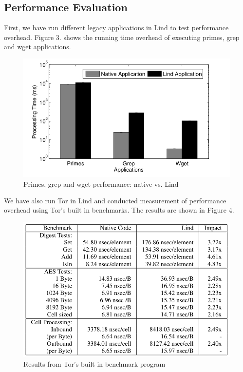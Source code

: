 \subsection{Performance Evaluation}

First, we have run different legacy applications in Lind to test performance overhead. Figure 3. shows the running time 
overhead of executing primes, grep and wget applications. 


\begin{figure}[h]
\centering
\includegraphics[width=1.0\columnwidth]{diagram/evaluation_01.png}
\caption{Primes, grep and wget performance: native vs. Lind}
\label{fig:arch}
\end{figure}


We have also run Tor in Lind and conducted measurement of performance overhead using Tor's built in benchmarks. 
The results are shown in Figure 4.


\begin{figure}[h]
\centering
\includegraphics[width=0.9\columnwidth]{diagram/evaluation_02.png}
\caption{Results from Tor's built in benchmark program}
\label{fig:arch}
\end{figure}


